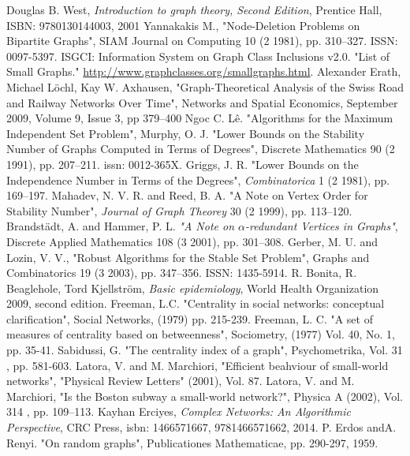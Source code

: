 \documentclass[14pt, oneside, a4paper, openany]{scrartcl}
\begin{document}
\printindex
\newpage
\begin{thebibliography}{9}
	Douglas B. West,
	\textit{Introduction to graph theory, Second Edition},
	Prentice Hall, ISBN: 9780130144003, 2001
	Yannakakis M.,
	"Node-Deletion Problems on Bipartite Graphs",
	SIAM Journal on Computing 10 (2 1981), pp. 310–327. ISSN: 0097-5397.
	ISGCI: Information System on Graph Class Inclusions v2.0. "List of Small Graphs." \href{http://www.graphclasses.org/smallgraphs.html}{http://www.graphclasses.org/smallgraphs.html}.
	Alexander Erath, Michael Löchl, Kay W. Axhausen,
	"Graph-Theoretical Analysis of the Swiss Road and Railway Networks Over Time", 
	Networks and Spatial Economics,
	September 2009, Volume 9, Issue 3, pp 379–400
	Ngoc C. Lê.
	"Algorithms for the Maximum Independent Set Problem",
	Murphy, O. J.
	"Lower Bounds on the Stability Number of Graphs Computed in Terms of Degrees", Discrete Mathematics 90 (2 1991), pp. 207–211. issn: 0012-365X. 
	Griggs, J. R.
	"Lower Bounds on the Independence Number in Terms of the Degrees",
	\textit{Combinatorica} 1 (2 1981), pp. 169–197.
	Mahadev, N. V. R. and Reed, B. A.
	"A Note on Vertex Order for Stability Number",
	\textit{Journal of Graph Theorey} 30 (2 1999), pp. 113–120.
	Brandstädt, A. and Hammer, P. L.
	\textit{"A Note on $\alpha$-redundant Vertices in Graphs"},
	Discrete Applied Mathematics 108 (3 2001), pp. 301–308.
	Gerber, M. U. and Lozin, V. V.,
	"Robust Algorithms for the Stable Set Problem",
	Graphs and Combinatorics 19 (3 2003), pp. 347–356. ISSN: 1435-5914.
	R. Bonita, R. Beaglehole, Tord Kjellström,
	\textit{Basic epidemiology},
	World Health Organization 2009, second edition.
	Freeman, L.C.
	"Centrality in social networks: conceptual clarification",
	Social Networks, (1979) pp. 215-239.
	Freeman, L. C.
	"A set of measures of centrality based on betweenness",
	Sociometry, (1977) Vol. 40, No. 1, pp. 35-41.
	Sabidussi, G. 
	"The centrality index of a graph",
	 Psychometrika, Vol. 31 , pp. 581-603.
	 Latora, V. and M. Marchiori,
	 "Efficient beahviour of small-world networks",
	 "Physical Review Letters" (2001), Vol. 87.
	 Latora, V. and M. Marchiori, 
	 "Is the Boston subway a small-world network?",
	 Physica A (2002), Vol. 314 , pp. 109–113.
	 Kayhan Erciyes,
	 \textit{Complex Networks: An Algorithmic Perspective},
	 CRC Press, isbn: 1466571667, 9781466571662, 2014.
	 P. Erdos andA. Renyi.
	 "On random graphs",
	 Publicationes Mathematicae, pp. 290-297, 1959.
\end{thebibliography}
\end{document}
